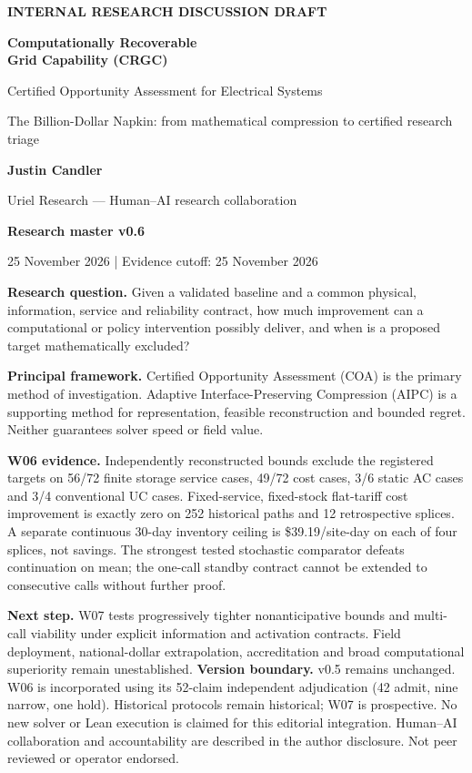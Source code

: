 \documentclass[11pt,letterpaper]{article}
\begin{document}
\hypersetup{pageanchor=false}\begin{titlepage}
{\small\bfseries INTERNAL RESEARCH DISCUSSION DRAFT\par}\vspace{0.9cm}
{\Huge\color{navy}\bfseries Computationally Recoverable\\[4pt] Grid Capability (CRGC)\par}\vspace{0.55cm}
{\LARGE Certified Opportunity Assessment for Electrical Systems\par}\vspace{0.3cm}
{\large The Billion-Dollar Napkin: from mathematical compression to certified research triage\par}\vspace{0.7cm}
{\Large\bfseries Justin Candler\par}
{\normalsize Uriel Research --- Human--AI research collaboration\par}
\vspace{0.5cm}
{\Large\bfseries Research master v0.6\par}
25 November 2026 \quad | \quad Evidence cutoff: 25 November 2026\par
\vspace{0.75cm}
\textbf{Research question.} Given a validated baseline and a common physical, information, service and reliability contract, how much improvement can a computational or policy intervention possibly deliver, and when is a proposed target mathematically excluded?

\textbf{Principal framework.} Certified Opportunity Assessment (COA) is the primary method of investigation. Adaptive Interface-Preserving Compression (AIPC) is a supporting method for representation, feasible reconstruction and bounded regret. Neither guarantees solver speed or field value.

\textbf{W06 evidence.} Independently reconstructed bounds exclude the registered targets on 56/72 finite storage service cases, 49/72 cost cases, 3/6 static AC cases and 3/4 conventional UC cases. Fixed-service, fixed-stock flat-tariff cost improvement is exactly zero on 252 historical paths and 12 retrospective splices. A separate continuous 30-day inventory ceiling is \$39.19/site-day on each of four splices, not savings. The strongest tested stochastic comparator defeats continuation on mean; the one-call standby contract cannot be extended to consecutive calls without further proof.

\textbf{Next step.} W07 tests progressively tighter nonanticipative bounds and multi-call viability under explicit information and activation contracts. Field deployment, national-dollar extrapolation, accreditation and broad computational superiority remain unestablished.
\vfill
\textbf{Version boundary.} v0.5 remains unchanged. W06 is incorporated using its 52-claim independent adjudication (42 admit, nine narrow, one hold). Historical protocols remain historical; W07 is prospective. No new solver or Lean execution is claimed for this editorial integration. Human--AI collaboration and accountability are described in the author disclosure. Not peer reviewed or operator endorsed.
\end{titlepage}\hypersetup{pageanchor=true}
\end{document}

